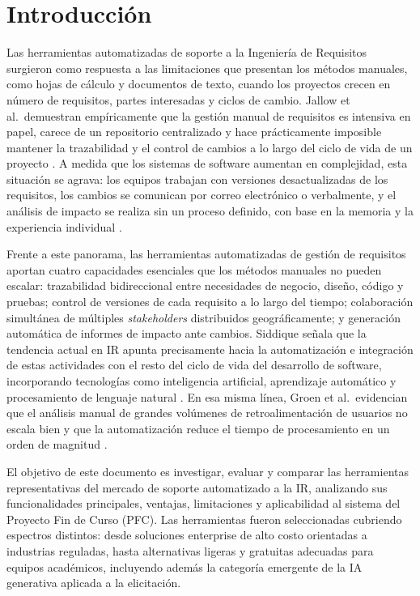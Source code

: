 \documentclass[journal,onecolumn]{IEEEtran}
\begin{document}
\tableofcontents
\newpage

\section{Introducción}
Las herramientas automatizadas de soporte a la Ingeniería de
Requisitos surgieron como respuesta a las limitaciones que presentan
los métodos manuales, como hojas de cálculo y documentos de texto, cuando
los proyectos crecen en número de requisitos, partes interesadas y
ciclos de cambio. Jallow et al.\ demuestran empíricamente que la
gestión manual de requisitos es intensiva en papel, carece de un
repositorio centralizado y hace prácticamente imposible mantener la
trazabilidad y el control de cambios a lo largo del ciclo de vida de
un proyecto \cite{jallow2014}. A medida que los sistemas de software
aumentan en complejidad, esta situación se agrava: los equipos trabajan
con versiones desactualizadas de los requisitos, los cambios se comunican por correo electrónico o verbalmente, y el análisis de impacto se realiza sin un proceso definido, con base en la memoria y la experiencia individual \cite{jallow2014}.

Frente a este panorama, las herramientas automatizadas de gestión de
requisitos aportan cuatro capacidades esenciales que los métodos
manuales no pueden escalar: trazabilidad bidireccional entre necesidades
de negocio, diseño, código y pruebas; control de versiones de cada
requisito a lo largo del tiempo; colaboración simultánea de múltiples
\textit{stakeholders} distribuidos geográficamente; y generación
automática de informes de impacto ante cambios. Siddique señala que la
tendencia actual en IR apunta precisamente hacia la automatización e
integración de estas actividades con el resto del ciclo de vida del
desarrollo de software, incorporando tecnologías como inteligencia
artificial, aprendizaje automático y procesamiento de lenguaje natural
\cite{siddique2023}. En esa misma línea, Groen et al.\ evidencian que
el análisis manual de grandes volúmenes de retroalimentación de usuarios
no escala bien y que la automatización reduce el tiempo de procesamiento
en un orden de magnitud \cite{groen2018}.

El objetivo de este documento es investigar, evaluar y comparar las
herramientas representativas del mercado de soporte automatizado a la
IR, analizando sus funcionalidades principales, ventajas,
limitaciones y aplicabilidad al sistema del Proyecto Fin de Curso (PFC).
Las herramientas fueron seleccionadas cubriendo espectros distintos:
desde soluciones enterprise de alto costo orientadas a industrias
reguladas, hasta alternativas ligeras y gratuitas adecuadas para equipos
académicos, incluyendo además la categoría emergente de la IA
generativa aplicada a la elicitación.
\end{document}
